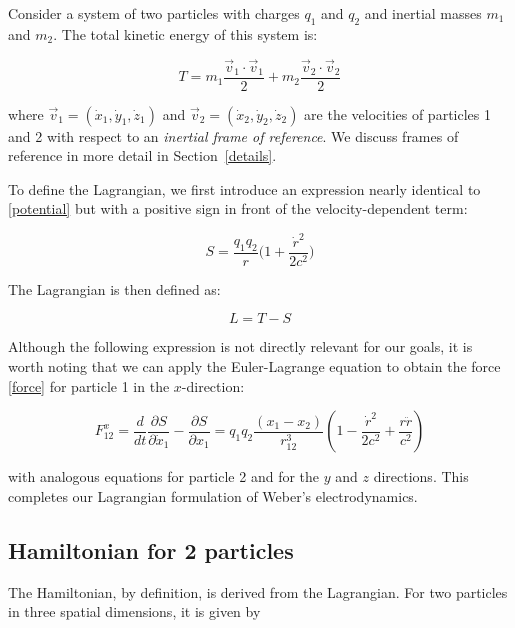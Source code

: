 \documentclass[12pt,a4paper]{article}
\theoremstyle{definition}
\theoremstyle{remark}
\newcommand{\qq}{q_1 q_2}
\newcommand{\rdot}{\dot{r}}
\begin{document}
Consider a system of two particles with charges $q_1$ and $q_2$ and inertial masses $m_1$ and $m_2$. The total kinetic energy of this system is:

\begin{equation}\label{ke}
    T = m_1 \frac{\vec{v}_1 \cdot \vec{v}_1}{2} + m_2 \frac{\vec{v}_2 \cdot \vec{v}_2}{2}
\end{equation}

where $\vec{v}_1 = (\dot{x}_1, \dot{y}_1, \dot{z}_1)$ and $\vec{v}_2 = (\dot{x}_2, \dot{y}_2, \dot{z}_2)$ are the velocities of particles 1 and 2 with respect to an \textit{inertial frame of reference}. We discuss frames of reference in more detail in Section~\ref{details}.

To define the Lagrangian, we first introduce an expression nearly identical to \eqref{potential} but with a positive sign in front of the velocity-dependent term:

\begin{equation}
    S = \frac{\qq}{r}\bigg(1 + \frac{\rdot^2}{2c^2}\bigg)
\end{equation}

The Lagrangian is then defined as:

\begin{equation}
    \boxed{L = T - S}
\end{equation}

Although the following expression is not directly relevant for our goals, it is worth noting that we can apply the Euler-Lagrange equation to obtain the force \eqref{force} for particle 1 in the $x$-direction:

\begin{equation}\label{euler_lagrange}
    F_{12}^x = \frac{d}{dt}\frac{\partial S}{\partial \dot{x}_1} - \frac{\partial S}{\partial x_1} = \qq \frac{(x_1 - x_2)}{r_{12}^3} \left(1 - \frac{\dot{r}^2}{2c^2} + \frac{r\ddot{r}}{c^2}\right)
\end{equation}

with analogous equations for particle 2 and for the $y$ and $z$ directions. This completes our Lagrangian formulation of Weber's electrodynamics.

\subsection{Hamiltonian for 2 particles}
The Hamiltonian, by definition, is derived from the Lagrangian. For two particles in three spatial dimensions, it is given by
\end{document}
